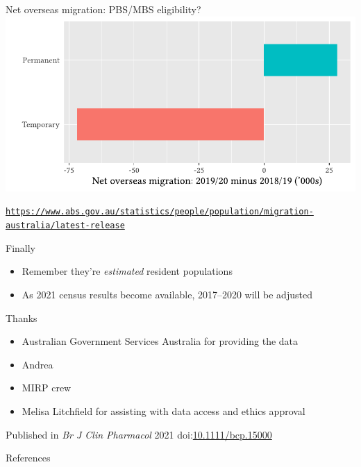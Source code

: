 \documentclass[aspectratio=169,12pt]{beamer} %
\begin{document}
\begin{frame}{Net overseas migration: PBS/MBS eligibility?}
	\center\includegraphics[height=0.75\textheight]{ref/pops-nom.pdf}
	\begin{flushright}\tiny\texttt{\url{https://www.abs.gov.au/statistics/people/population/migration-australia/latest-release}}\end{flushright}
\end{frame}

\begin{frame}{Finally}
	\begin{itemize}
		\item Remember they're \emph{estimated} resident populations
		\item As 2021 census results become available, 2017--2020 will be adjusted
	\end{itemize}
\end{frame}

\begin{frame}{Thanks}
    \begin{itemize}
        \item Australian Government Services Australia for providing the data
	\item Andrea
	\item MIRP crew
	\item Melisa Litchfield for assisting with data access and ethics approval
    \end{itemize}
\vfill
	Published in \emph{Br J Clin Pharmacol} 2021 doi:\href{https://doi.org/10.1111/bcp.15000}{10.1111/bcp.15000}
\end{frame}

\begin{frame}{References}
%        
%        
        \tiny
        
\end{frame}
\end{document}
